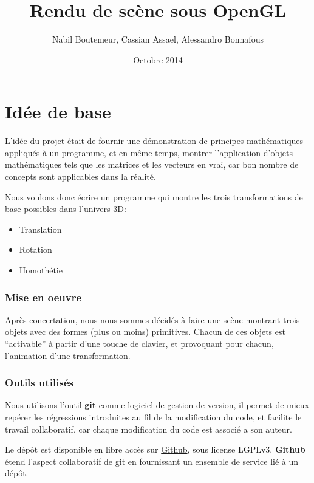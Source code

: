 \documentclass[pdftex, 11pt, a4paper, titlepage]{article}
\begin{document}
\title{Rendu de scène sous OpenGL}
\author{Nabil Boutemeur,
         Cassian Assael,
             Alessandro
              Bonnafous} 
\date{Octobre 2014}
\maketitle

\setcounter{tocdepth}{4}

\tableofcontents
\pagebreak

\part{Idée de base}
L'idée du projet était de fournir une démonstration de principes
mathématiques appliqués à un programme, et en même temps, montrer
l'application d'objets mathématiques tels que les matrices et les
vecteurs en vrai, car bon nombre de concepts sont applicables dans la
réalité.

Nous voulons donc écrire un programme qui montre les trois
transformations de base possibles dans l'univers 3D:
\begin{itemize}
\item Translation
\item Rotation
\item Homothétie
\end{itemize}
\section{Mise en oeuvre}

Après concertation, nous nous sommes décidés à faire une scène
montrant trois objets avec des formes (plus ou moins) primitives.
Chacun de ces objets est ``activable'' à partir d'une touche de
clavier, et provoquant pour chacun, l'animation d'une transformation.
\pagebreak

\section{Outils utilisés}

Nous utilisons l'outil \textbf{git} comme logiciel de gestion de
version, il permet de mieux repérer les régressions introduites au fil
de la modification du code, et facilite le travail collaboratif, car
chaque modification du code est associé a son auteur.

Le dépôt est disponible en libre accès sur
\href{https://github.com/nbouteme/OpenGL-Demo}{{\color{blue}Github}},
sous license LGPLv3.  \textbf{Github} étend l'aspect collaboratif de
git en fournissant un ensemble de service lié à un dépôt.
\end{document}
